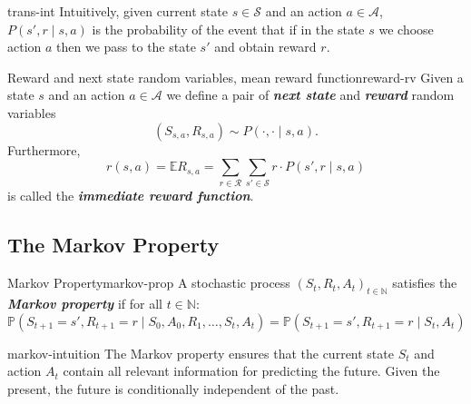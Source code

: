 \documentclass[a4paper, 11pt]{article}
\numberwithin{equation}{section}
\theoremstyle{plain}
\theoremstyle{definition}
\renewcommand{\P}{\mathbb{P}}
\newcommand{\E}{{\mathbb E}}
\newcommand{\1}{{\mathbbm 1}}
\newcommand{\mc}[1]{\mathcal{#1}}
\newcommand{\bi}[1]{\textbf{\textit{#1}}}
\newcommand{\N}{{\mathbb{N}}}
\begin{document}
	\begin{frema}{}{trans-int}
		Intuitively, given current state $s \in \mc{S}$ and an action $a \in \mc{A}$, $P(s', r\;|\; s, a)$ is the probability of the event that if in the state $s$ we choose action $a$ then we pass to the state $s'$ and obtain reward $r$.
	\end{frema}
	
	\begin{fdefi}{Reward and next state random variables, mean reward function}{reward-rv}
		Given a state $s$ and an action $a \in \mc{A}$ we define a pair of \bi{next state} and \bi{reward} random variables
		\begin{equation}
			(S_{s, a}, R_{s, a}) \sim P(\cdot, \cdot\;|\; s, a).
		\end{equation}
		Furthermore, 
		\begin{equation}
			r(s, a) = \E R_{s, a} = \sum_{r \in \mc{R}} \sum_{s' \in \mc{S}} r \cdot P(s', r\;|\; s, a)
		\end{equation}
		is called the \bi{immediate reward function}.
	\end{fdefi}
	
	\subsection{The Markov Property}
	
	\begin{fdefi}{Markov Property}{markov-prop}
		A stochastic process $(S_t, R_t, A_t)_{t \in \N}$ satisfies the \bi{Markov property} if for all $t \in \N$:
		\begin{equation}
			\P(S_{t+1} = s', R_{t+1} = r \;|\; S_0, A_0, R_1, \ldots, S_t, A_t) = \P(S_{t+1} = s', R_{t+1} = r \;|\; S_t, A_t)
		\end{equation}
	\end{fdefi}
	
	\begin{frema}{}{markov-intuition}
		The Markov property ensures that the current state $S_t$ and action $A_t$ contain all relevant information for predicting the future. Given the present, the future is conditionally independent of the past.
	\end{frema}
	
\end{document}
